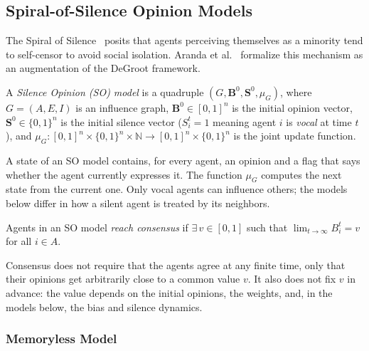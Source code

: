 \subsection{Spiral-of-Silence Opinion Models}
\label{sec:som}

The Spiral of Silence~\cite{NoelleNeumann1974,NoelleNeumann1984}
posits that agents perceiving themselves as a minority tend to
self-censor to avoid social isolation.
Aranda et al.~\cite{aranda2024sound} formalize this
mechanism as an augmentation of the DeGroot framework.

\begin{definition}
\label{def:som}
  A \emph{Silence Opinion (SO) model} is a quadruple
  $(G,\mathbf{B}^0,\mathbf{S}^0,\mu_G)$, where $G=(A,E,I)$ is an
  influence graph, $\mathbf{B}^0\in[0,1]^n$ is the initial opinion
  vector, $\mathbf{S}^0\in\{0,1\}^n$ is the initial silence vector
  ($S_i^t=1$ meaning agent $i$ is \emph{vocal} at time $t$), and
  $\mu_G:[0,1]^n\times\{0,1\}^n\times\mathbb{N}
   \to[0,1]^n\times\{0,1\}^n$ is the joint update function.
\end{definition}

A state of an SO model contains, for every agent, an opinion and a flag
that says whether the agent currently expresses it. The function $\mu_G$
computes the next state from the current one. Only vocal agents can
influence others; the models below differ in how a silent agent is
treated by its neighbors.

\begin{definition}[Consensus]\label{def:consensus}
  Agents in an SO model \emph{reach consensus} if $\exists\,v\in[0,1]$
  such that $\lim_{t\to\infty}B_i^t=v$ for all $i\in A$.
\end{definition}

Consensus does not require that the agents agree at any finite time, only
that their opinions get arbitrarily close to a common value $v$. It also
does not fix $v$ in advance: the value depends on the initial opinions,
the weights, and, in the models below, the bias and silence dynamics.

\subsubsection{Memoryless Model \texorpdfstring{\SOMminus}{SOM-}}
\label{sec:som-minus}


